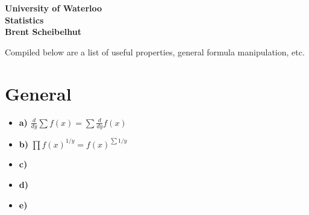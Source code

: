 \documentclass[12pt]{article}
\begin{document}
\begin{center}
{\Large\bf University of Waterloo}\\
\vspace{3mm}
{\Large\bf Statistics}\\
\vspace{3mm}
\textbf{Brent Scheibelhut}
\end{center}

\def\question#1{\item[\bf #1.]}
\def\part#1{\item[\bf #1)]}
\newcommand{\pc}[1]{\mbox{\textbf{#1}}} %

Compiled below are a list of useful properties, general formula manipulation, etc.

\section{General}

\begin{minipage}[t]{8cm}
\begin{itemize}
\part{a} $\frac{d}{dy} \sum f(x) = \sum \frac{d}{dy} f(x)$
\part{b} $\prod f(x)^{1/y} = f(x)^{\sum 1/y}$
\part{c} 
\end{itemize}
\end{minipage}
\begin{minipage}[t]{8cm}
\begin{itemize}
\part{d} 
\part{e} 
\end{itemize}
\end{minipage}
\end{document}
